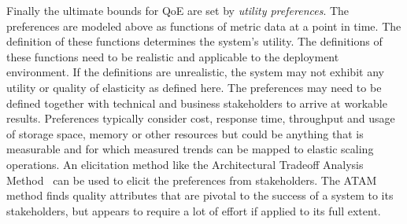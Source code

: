 \documentclass[english]{tktltiki2}
\theoremstyle{definition}
\theoremstyle{remark}
\begin{document}
Finally the ultimate bounds for QoE are set by \textit{utility preferences}. The
preferences are modeled above as functions of metric data at a point in time.
The definition of these functions determines the system's utility. The
definitions of these functions need to be realistic and applicable to the
deployment environment. If the definitions are unrealistic, the system may not
exhibit any utility or quality of elasticity as defined here.  The preferences
may need to be defined together with technical and business stakeholders to
arrive at workable results. Preferences typically consider cost, response time,
throughput and usage of storage space, memory or other resources but could be
anything that is measurable and for which measured trends can be mapped to
elastic scaling operations. An elicitation method like the Architectural
Tradeoff Analysis Method~\cite{ATAM} can be used to elicit the preferences from
stakeholders. The ATAM method finds quality attributes that are pivotal to the
success of a system to its stakeholders, but appears to require a lot of effort
if applied to its full extent.



\end{document}
